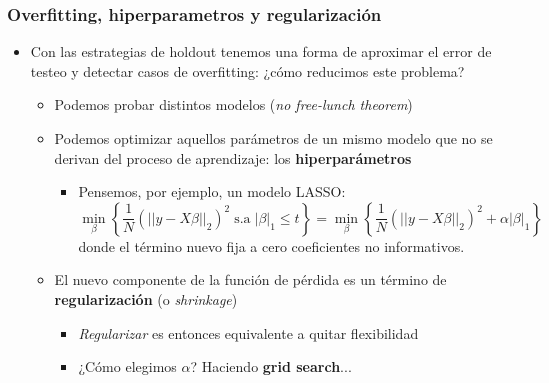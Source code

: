 \documentclass[leqno, 10pt, envcountsect]{beamer}
\numberwithin{equation}{section}
\theoremstyle{definition}
\theoremstyle{example}
\numberwithin{figure}{section}
\numberwithin{table}{section}
\let\olditem\item
\renewcommand{\item}{%
\olditem\vspace{1pt}}
\begin{document}
\begin{frame}
  \frametitle{Overfitting, hiperparametros y regularización}
  \begin{itemize}
    \item Con las estrategias de holdout tenemos una forma de aproximar el
      error de testeo y detectar casos de overfitting: ¿cómo reducimos este
      problema?
      \begin{itemize}
        \item Podemos probar distintos modelos (\textit{no free-lunch
          theorem})
        \item Podemos optimizar aquellos parámetros de un mismo modelo que no
          se derivan del proceso de aprendizaje: los \textbf{hiperparámetros}
          \begin{itemize}
            \item Pensemos, por ejemplo, un modelo LASSO:
              \begin{equation*}
                \min_{\beta}\left\{\frac{1}{N}(||y - X\beta||_{2})^{2}\;
                \text{s.a}\;
                |\beta|_{1} \leq t\right\} =
                \min_{\beta}\left\{\frac{1}{N}(||y - X\beta||_{2})^{2} +
                \alpha |\beta|_{1}\right\}
              \end{equation*}
              donde el término nuevo fija a cero coeficientes no informativos.
          \end{itemize}
        \item El nuevo componente de la función de pérdida es un término de
          \textbf{regularización} (o \textit{shrinkage})
          \begin{itemize}
            \item \textit{Regularizar} es entonces equivalente a quitar
              flexibilidad
            \item ¿Cómo elegimos $\alpha$? Haciendo \textbf{grid search}...
          \end{itemize}
      \end{itemize}
  \end{itemize}
  \begin{center}

\end{center}
\end{frame}
\end{document}
